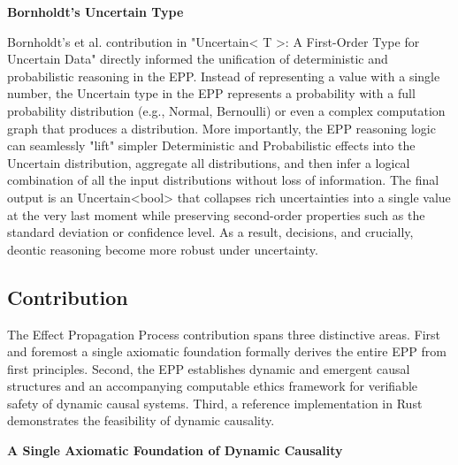 \textbf{Bornholdt's Uncertain Type}

Bornholdt's et al. contribution in "Uncertain< T >: A First-Order Type for Uncertain Data" \cite{bornholt2014uncertain} directly informed the unification of deterministic and probabilistic reasoning in the EPP. Instead of representing a value with a single number, the Uncertain type in the EPP represents a probability with a full probability distribution (e.g., Normal, Bernoulli) or even a complex computation graph that produces a distribution. More importantly, the EPP reasoning logic can seamlessly "lift" simpler Deterministic and Probabilistic effects into the Uncertain distribution, aggregate all distributions, and then infer a logical combination of all the input distributions without loss of information. The final output is an Uncertain<bool> that collapses rich uncertainties into a single value at the very last moment while preserving second-order properties such as the standard deviation or confidence level. As a result, decisions, and crucially, deontic reasoning become more robust under uncertainty.


\subsection{Contribution}

The Effect Propagation Process contribution spans three distinctive areas. First and foremost a single axiomatic foundation  formally derives the entire EPP from first principles. Second, the EPP establishes dynamic and emergent causal structures and an accompanying computable ethics framework for verifiable safety of dynamic causal systems. Third, a reference implementation in Rust demonstrates the feasibility of dynamic causality.   


\textbf{A Single Axiomatic Foundation of Dynamic Causality}


